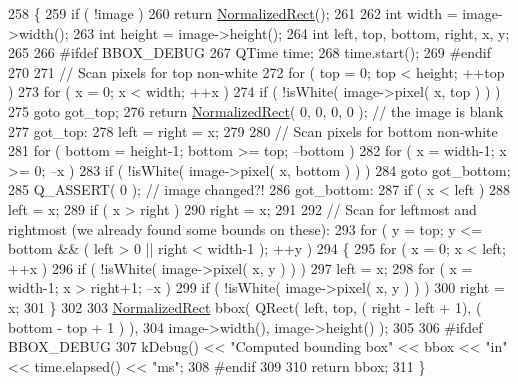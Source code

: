 \begin{DoxyCode}
258 \{
259     \textcolor{keywordflow}{if} ( !image )
260         \textcolor{keywordflow}{return} \hyperlink{classOkular_1_1NormalizedRect}{NormalizedRect}();
261 
262     \textcolor{keywordtype}{int} width = image->width();
263     \textcolor{keywordtype}{int} height = image->height();
264     \textcolor{keywordtype}{int} left, top, bottom, right, x, y;
265 
266 \textcolor{preprocessor}{#ifdef BBOX\_DEBUG}
267     QTime time;
268     time.start();
269 \textcolor{preprocessor}{#endif}
270 
271     \textcolor{comment}{// Scan pixels for top non-white}
272     \textcolor{keywordflow}{for} ( top = 0; top < height; ++top )
273         \textcolor{keywordflow}{for} ( x = 0; x < width; ++x )
274             \textcolor{keywordflow}{if} ( !isWhite( image->pixel( x, top ) ) )
275                 \textcolor{keywordflow}{goto} got\_top;
276     \textcolor{keywordflow}{return} \hyperlink{classOkular_1_1NormalizedRect}{NormalizedRect}( 0, 0, 0, 0 ); \textcolor{comment}{// the image is blank}
277 got\_top:
278     left = right = x;
279 
280     \textcolor{comment}{// Scan pixels for bottom non-white}
281     \textcolor{keywordflow}{for} ( bottom = height-1; bottom >= top; --bottom )
282         \textcolor{keywordflow}{for} ( x = width-1; x >= 0; --x )
283             \textcolor{keywordflow}{if} ( !isWhite( image->pixel( x, bottom ) ) )
284                 \textcolor{keywordflow}{goto} got\_bottom;
285     Q\_ASSERT( 0 ); \textcolor{comment}{// image changed?!}
286 got\_bottom:
287     \textcolor{keywordflow}{if} ( x < left )
288         left = x;
289     \textcolor{keywordflow}{if} ( x > right )
290         right = x;
291 
292     \textcolor{comment}{// Scan for leftmost and rightmost (we already found some bounds on these):}
293     \textcolor{keywordflow}{for} ( y = top; y <= bottom && ( left > 0 || right < width-1 ); ++y )
294     \{
295         \textcolor{keywordflow}{for} ( x = 0; x < left; ++x )
296             \textcolor{keywordflow}{if} ( !isWhite( image->pixel( x, y ) ) )
297                 left = x;
298         \textcolor{keywordflow}{for} ( x = width-1; x > right+1; --x )
299             \textcolor{keywordflow}{if} ( !isWhite( image->pixel( x, y ) ) )
300                 right = x;
301     \}
302 
303     \hyperlink{classOkular_1_1NormalizedRect}{NormalizedRect} bbox( QRect( left, top, ( right - left + 1), ( bottom - top + 1 ) ),
304                          image->width(), image->height() );
305 
306 \textcolor{preprocessor}{#ifdef BBOX\_DEBUG}
307     kDebug() << \textcolor{stringliteral}{"Computed bounding box"} << bbox << \textcolor{stringliteral}{"in"} << time.elapsed() << \textcolor{stringliteral}{"ms"};
308 \textcolor{preprocessor}{#endif}
309 
310     \textcolor{keywordflow}{return} bbox;
311 \}
\end{DoxyCode}
